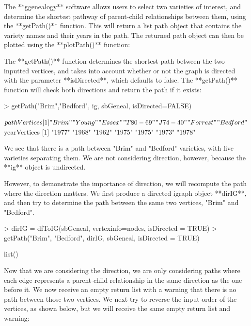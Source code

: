 \documentclass{article}
\numberwithin{equation}{section} %
\begin{document}
The **ggenealogy** software allows users to select two varieties of interest, and determine the shortest pathway of parent-child relationships between them, using the **getPath()** function. This will return a list path object that contains the variety names and their years in the path. The returned path object can then be plotted using the **plotPath()** function:

The **getPath()** function determines the shortest path between the two inputted vertices, and takes into account whether or not the graph is directed with the parameter **isDirected**, which defaults to false. The **getPath()** function will check both directions and return the path if it exists:

\begin{Schunk}
\begin{Sinput}
> getPath("Brim","Bedford", ig, sbGeneal, isDirected=FALSE)
\end{Sinput}
\begin{Soutput}
$pathVertices
[1] "Brim"    "Young"   "Essex"   "T80-69"  "J74-40"  "Forrest" "Bedford"

$yearVertices
[1] "1977" "1968" "1962" "1975" "1975" "1973" "1978"
\end{Soutput}
\end{Schunk}

We see that there is a path between "Brim" and "Bedford" varieties, with five varieties separating them. We are not considering direction, however, because the **ig** object is undirected.

However, to demonstrate the importance of direction, we will recompute the path where the direction matters. We first produce a directed igraph object **dirIG**, and then try to determine the path between the same two vertices, "Brim" and "Bedford".

\begin{Schunk}
\begin{Sinput}
> dirIG = dfToIG(sbGeneal, vertexinfo=nodes, isDirected = TRUE)
> getPath("Brim", "Bedford", dirIG, sbGeneal, isDirected = TRUE)
\end{Sinput}
\begin{Soutput}
list()
\end{Soutput}
\end{Schunk}

Now that we are considering the direction, we are only considering paths where each edge represents a parent-child relationship in the same direction as the one before it. We now receive an empty return list with a warning that there is no path between those two vertices. We  next try to reverse the input order of the vertices, as shown below, but we will receive the same empty return list and warning:
\end{document}
